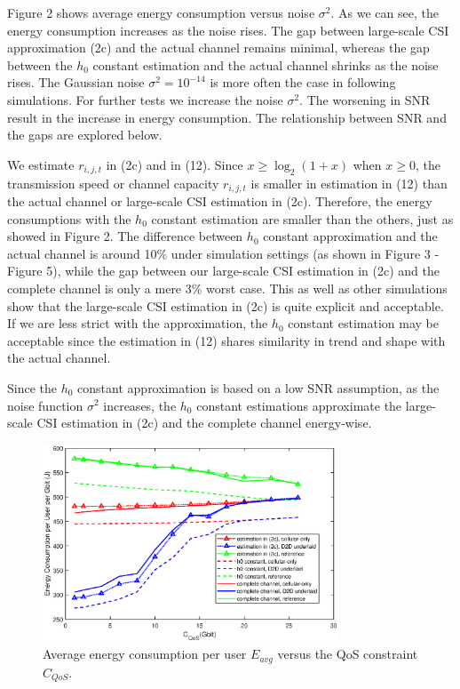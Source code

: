 \documentclass{ieeeaccess}
\begin{document}

Figure 2 shows average energy consumption versus noise ${\sigma ^2}$. As we can see, the energy consumption increases as the noise rises. The gap between large-scale CSI approximation (2c) and the actual channel remains minimal, whereas the gap between the ${h_0}$ constant estimation and the actual channel shrinks as the noise rises. The Gaussian noise ${\sigma ^2 ={10^{ - 14}}}$ is more often the case in following simulations. For further tests we increase the noise ${\sigma ^2}$. The worsening in SNR result in the increase in energy consumption. The relationship between SNR and the gaps are explored below. 

We estimate ${r_{i,j,t}}$ in (2c) and in (12). Since $x \ge {\log _2}\left( {1 + x} \right)$ when ${x \ge 0}$, the transmission speed or channel capacity ${r_{i,j,t}}$ is smaller in estimation in (12) than the actual channel or large-scale CSI estimation in (2c). Therefore, the energy consumptions with the ${h_0}$ constant estimation are smaller than the others, just as showed in Figure 2. The difference between ${h_0}$ constant approximation and the actual channel is around 10\% under simulation settings (as shown in Figure 3 - Figure 5), while the gap between our large-scale CSI estimation in (2c) and the complete channel is only a mere 3\% worst case. This as well as other simulations show that the large-scale CSI estimation in (2c) is quite explicit and acceptable. If we are less strict with the approximation, the ${h_0}$ constant estimation may be acceptable since the estimation in (12) shares similarity in trend and shape with the actual channel. 

Since the ${h_0}$ constant approximation is based on a low SNR assumption, as the noise function ${\sigma ^2}$ increases, the ${h_0}$ constant estimations approximate the large-scale CSI estimation in (2c) and the complete channel energy-wise.


\begin{figure} [htb]
\includegraphics*[width=8.8cm]{Cqos.eps}
\caption{Average energy consumption per user $E_{avg}$ versus the QoS constraint ${C_{QoS}}$.}\label{fig:3}
\end{figure}
\end{document}
